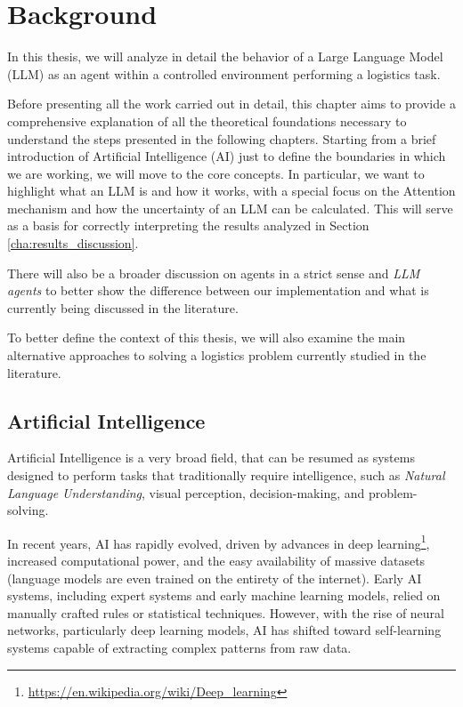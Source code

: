 \chapter{Background}
\label{cha:background}

In this thesis, we will analyze in detail the behavior of a Large Language Model
(LLM) as an agent within a controlled environment performing a logistics task.

Before presenting all the work carried out in detail, this chapter aims to
provide a comprehensive explanation of all the theoretical foundations necessary
to understand the steps presented in the following chapters. Starting from a brief
introduction of Artificial Intelligence (AI) just to define the boundaries in which
we are working, we will move to the core concepts. In particular, we want to
highlight what an LLM is and how it works, with a special focus on the Attention
mechanism and how the uncertainty of an LLM can be calculated. This will serve
as a basis for correctly interpreting the results analyzed in Section
\ref{cha:results_discussion}.

There will also be a broader discussion on agents in a strict sense and \emph{LLM
agents} to better show the difference between our implementation and what is currently
being discussed in the literature.

To better define the context of this thesis, we will also examine the main
alternative approaches to solving a logistics problem currently studied in the
literature.

\section{Artificial Intelligence}
\label{sec:artificial_intelligence}

Artificial Intelligence is a very broad field, that can be resumed as systems
designed to perform tasks that traditionally require intelligence, such as \emph{Natural
Language Understanding}, visual perception, decision-making, and problem-solving.

In recent years, AI has rapidly evolved, driven by advances in deep learning\footnote{\url{https://en.wikipedia.org/wiki/Deep_learning}},
increased computational power, and the easy availability of massive datasets (language
models are even trained on the entirety of the internet). Early AI systems,
including expert systems and early machine learning models, relied on manually crafted
rules or statistical techniques. However, with the rise of neural networks,
particularly deep learning models, AI has shifted toward self-learning systems capable
of extracting complex patterns from raw data.

